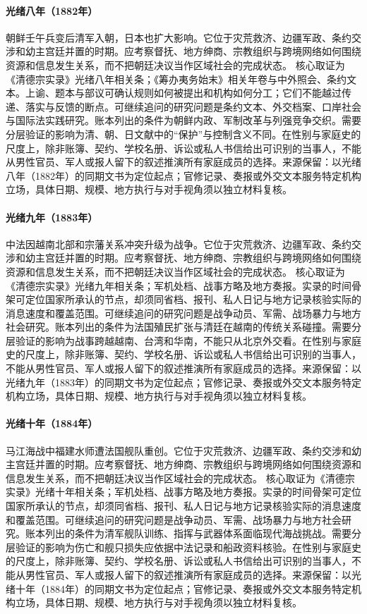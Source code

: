 \hypertarget{public:EQ-1882-IMO-INCIDENT}{}\paragraph{光绪八年（1882年）}朝鲜壬午兵变后清军入朝，日本也扩大影响。它位于灾荒救济、边疆军政、条约交涉和幼主宫廷并置的时期。应考察督抚、地方绅商、宗教组织与跨境网络如何围绕资源和信息发生关系，而不把朝廷决议当作区域社会的完成状态。 核心取证为《清德宗实录》光绪八年相关条；《筹办夷务始末》相关年卷与中外照会、条约文本。上谕、题本与部议可确认规则如何被提出和机构如何分工；它们不能越过传递、落实与反馈的断点。可继续追问的研究问题是条约文本、外交档案、口岸社会与国际法实践研究。账本列出的条件为朝鲜内政、军制改革与列强竞争交织。需要分层验证的影响为清、朝、日文献中的“保护”与控制含义不同。在性别与家庭史的尺度上，除非账簿、契约、学校名册、诉讼或私人书信给出可识别的当事人，不能从男性官员、军人或报人留下的叙述推演所有家庭成员的选择。来源保留：以光绪八年（1882年）的同期文书为定位起点；官修记录、奏报或外交文本服务特定机构立场，具体日期、规模、地方执行与对手视角须以独立材料复核。
\hypertarget{public:EQ-1883-SINO-FRENCH-WAR-BEGIN}{}\paragraph{光绪九年（1883年）}中法因越南北部和宗藩关系冲突升级为战争。它位于灾荒救济、边疆军政、条约交涉和幼主宫廷并置的时期。应考察督抚、地方绅商、宗教组织与跨境网络如何围绕资源和信息发生关系，而不把朝廷决议当作区域社会的完成状态。 核心取证为《清德宗实录》光绪九年相关条；军机处档、战事方略及地方奏报。实录的时间骨架可定位国家所承认的节点，却须同省档、报刊、私人日记与地方记录核验实际的消息速度和覆盖范围。可继续追问的研究问题是战争动员、军需、战场暴力与地方社会研究。账本列出的条件为法国殖民扩张与清廷在越南的传统关系碰撞。需要分层验证的影响为战事跨越越南、台湾和华南，不能只从北京外交看。在性别与家庭史的尺度上，除非账簿、契约、学校名册、诉讼或私人书信给出可识别的当事人，不能从男性官员、军人或报人留下的叙述推演所有家庭成员的选择。来源保留：以光绪九年（1883年）的同期文书为定位起点；官修记录、奏报或外交文本服务特定机构立场，具体日期、规模、地方执行与对手视角须以独立材料复核。
\hypertarget{public:EQ-1884-FUZHOU-NAVAL-BATTLE}{}\paragraph{光绪十年（1884年）}马江海战中福建水师遭法国舰队重创。它位于灾荒救济、边疆军政、条约交涉和幼主宫廷并置的时期。应考察督抚、地方绅商、宗教组织与跨境网络如何围绕资源和信息发生关系，而不把朝廷决议当作区域社会的完成状态。 核心取证为《清德宗实录》光绪十年相关条；军机处档、战事方略及地方奏报。实录的时间骨架可定位国家所承认的节点，却须同省档、报刊、私人日记与地方记录核验实际的消息速度和覆盖范围。可继续追问的研究问题是战争动员、军需、战场暴力与地方社会研究。账本列出的条件为清军舰队训练、指挥与武器体系面临现代海战挑战。需要分层验证的影响为伤亡和舰只损失应依据中法记录和船政资料核验。在性别与家庭史的尺度上，除非账簿、契约、学校名册、诉讼或私人书信给出可识别的当事人，不能从男性官员、军人或报人留下的叙述推演所有家庭成员的选择。来源保留：以光绪十年（1884年）的同期文书为定位起点；官修记录、奏报或外交文本服务特定机构立场，具体日期、规模、地方执行与对手视角须以独立材料复核。
